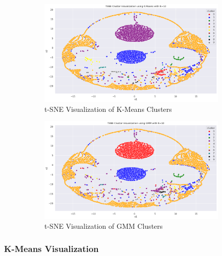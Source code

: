         \begin{figure}[H]
            \centering
            \begin{subfigure}[c]{0.47\textwidth}
                \centering
                \includegraphics[width=\textwidth]{../figures/plots/section3/tsne_kmeans_clusters.png}
                \caption{t-SNE Visualization of K-Means Clusters}
                \label{fig:tsne_kmeans}
            \end{subfigure}
            \hfill
            \begin{subfigure}[c]{0.47\textwidth}
                \centering
                \includegraphics[width=\textwidth]{../figures/plots/section3/tsne_gmm_clusters.png}
                \caption{t-SNE Visualization of GMM Clusters}
                \label{fig:tsne_gmm}
            \end{subfigure}
            \vspace{-0.1cm}
            \caption{}
            \label{fig:}
        \end{figure}

        \subsubsection{K-Means Visualization \\}
        
